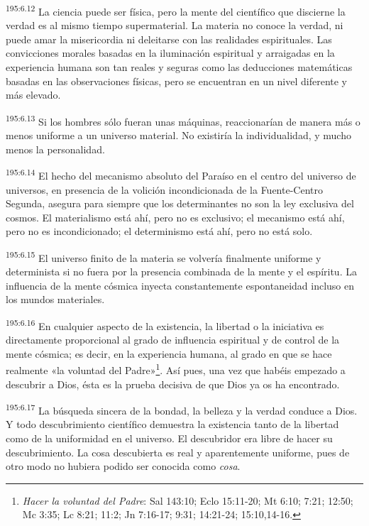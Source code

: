 \par 
\textsuperscript{195:6.12} La ciencia puede ser física, pero la mente del científico que discierne la verdad es al mismo tiempo supermaterial. La materia no conoce la verdad, ni puede amar la misericordia ni deleitarse con las realidades espirituales. Las convicciones morales basadas en la iluminación espiritual y arraigadas en la experiencia humana son tan reales y seguras como las deducciones matemáticas basadas en las observaciones físicas, pero se encuentran en un nivel diferente y más elevado.

\par 
\textsuperscript{195:6.13} Si los hombres sólo fueran unas máquinas, reaccionarían de manera más o menos uniforme a un universo material. No existiría la individualidad, y mucho menos la personalidad.

\par 
\textsuperscript{195:6.14} El hecho del mecanismo absoluto del Paraíso en el centro del universo de universos, en presencia de la volición incondicionada de la Fuente-Centro Segunda, asegura para siempre que los determinantes no son la ley exclusiva del cosmos. El materialismo está ahí, pero no es exclusivo; el mecanismo está ahí, pero no es incondicionado; el determinismo está ahí, pero no está solo.

\par 
\textsuperscript{195:6.15} El universo finito de la materia se volvería finalmente uniforme y determinista si no fuera por la presencia combinada de la mente y el espíritu. La influencia de la mente cósmica inyecta constantemente espontaneidad incluso en los mundos materiales.

\par 
\textsuperscript{195:6.16} En cualquier aspecto de la existencia, la libertad o la iniciativa es directamente proporcional al grado de influencia espiritual y de control de la mente cósmica; es decir, en la experiencia humana, al grado en que se hace realmente «la voluntad del Padre»\footnote{\textit{Hacer la voluntad del Padre}: Sal 143:10; Eclo 15:11-20; Mt 6:10; 7:21; 12:50; Mc 3:35; Lc 8:21; 11:2; Jn 7:16-17; 9:31; 14:21-24; 15:10,14-16.}. Así pues, una vez que habéis empezado a descubrir a Dios, ésta es la prueba decisiva de que Dios ya os ha encontrado.

\par 
\textsuperscript{195:6.17} La búsqueda sincera de la bondad, la belleza y la verdad conduce a Dios. Y todo descubrimiento científico demuestra la existencia tanto de la libertad como de la uniformidad en el universo. El descubridor era libre de hacer su descubrimiento. La cosa descubierta es real y aparentemente uniforme, pues de otro modo no hubiera podido ser conocida como \textit{cosa}.

